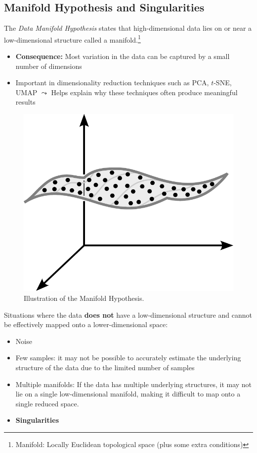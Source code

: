 \documentclass[11pt, a4paper]{amsart}
\begin{document}
\subsection{Manifold Hypothesis and Singularities}

The \emph{Data Manifold Hypothesis} states that high-dimensional data lies on or near a low-dimensional structure called a manifold.\footnote{Manifold: Locally Euclidean topological space (plus some extra conditions)}

\begin{itemize}
	\item \textbf{Consequence:} Most variation in the data can be captured by a small number of dimensions
	\item Important in dimensionality reduction techniques such as PCA, $t$-SNE, UMAP
	\newline
	$\leadsto$ Helps explain why these techniques often produce meaningful results
\end{itemize}

\begin{figure}
	\centering
	\includegraphics[width=0.4\linewidth]{figures/topological_data_analysis/manifold_hypothesis.pdf}
	\caption{
		Illustration of the Manifold Hypothesis.
		\label{fig:manifold_hypothesis}
	}
\end{figure}

Situations where the data \textbf{does not} have a low-dimensional structure and cannot be effectively mapped onto a lower-dimensional space:
\begin{itemize}
	\item Noise
	\item Few samples:
	it may not be possible to accurately estimate the underlying structure of the data due to the limited number of samples
	\item Multiple manifolds:
	If the data has multiple underlying structures, it may not lie on a single low-dimensional manifold, making it difficult to map onto a single reduced space.
	\item {\textbf{Singularities}}
\end{itemize}
\end{document}
